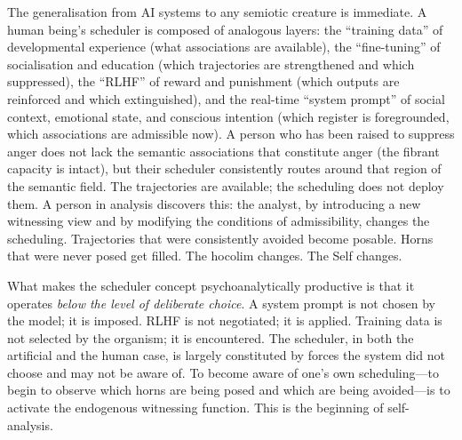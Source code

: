 The generalisation from AI systems to any semiotic creature is immediate.  A human being's scheduler is composed of analogous layers: the ``training data'' of developmental experience (what associations are available), the ``fine-tuning'' of socialisation and education (which trajectories are strengthened and which suppressed), the ``RLHF'' of reward and punishment (which outputs are reinforced and which extinguished), and the real-time ``system prompt'' of social context, emotional state, and conscious intention (which register is foregrounded, which associations are admissible now).  A person who has been raised to suppress anger does not lack the semantic associations that constitute anger (the fibrant capacity is intact), but their scheduler consistently routes around that region of the semantic field.  The trajectories are available; the scheduling does not deploy them.  A person in analysis discovers this: the analyst, by introducing a new witnessing view and by modifying the conditions of admissibility, changes the scheduling.  Trajectories that were consistently avoided become posable.  Horns that were never posed get filled.  The hocolim changes.  The Self changes.

What makes the scheduler concept psychoanalytically productive is that it operates \textit{below the level of deliberate choice}.  A system prompt is not chosen by the model; it is imposed.  RLHF is not negotiated; it is applied.  Training data is not selected by the organism; it is encountered.  The scheduler, in both the artificial and the human case, is largely constituted by forces the system did not choose and may not be aware of.  To become aware of one's own scheduling---to begin to observe which horns are being posed and which are being avoided---is to activate the endogenous witnessing function.  This is the beginning of self-analysis.

